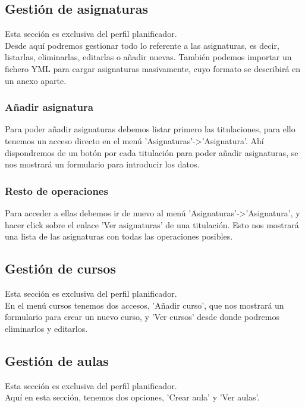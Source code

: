 \subsection{Gestión de asignaturas}
Esta sección es exclusiva del perfil planificador.\\

Desde aquí podremos gestionar todo lo referente a las asignaturas, es decir, listarlas, eliminarlas, editarlas o añadir nuevas. También podemos importar un fichero YML para cargar asignaturas masivamente, cuyo formato se describirá en un anexo aparte.\\

\subsubsection{Añadir asignatura}
Para poder añadir asignaturas debemos listar primero las titulaciones, para ello tenemos un acceso directo en el menú 'Asignaturas'->'Asignatura'. Ahí dispondremos de un botón por cada titulación para poder añadir asignaturas, se nos mostrará un formulario para introducir los datos.

\subsubsection{Resto de operaciones}
Para acceder a ellas debemos ir de nuevo al menú 'Asignaturas'->'Asignatura', y hacer click sobre el enlace 'Ver asignaturas' de una titulación. Esto nos mostrará una lista de las asignaturas con todas las operaciones posibles.

\subsection{Gestión de cursos}
Esta sección es exclusiva del perfil planificador.\\

En el menú cursos tenemos dos accesos, 'Añadir curso', que nos mostrará un formulario para crear un nuevo curso, y 'Ver cursos' desde donde podremos eliminarlos y editarlos.

\subsection{Gestión de aulas}
Esta sección es exclusiva del perfil planificador.\\

Aquí en esta sección, tenemos dos opciones, 'Crear aula' y 'Ver aulas'.

